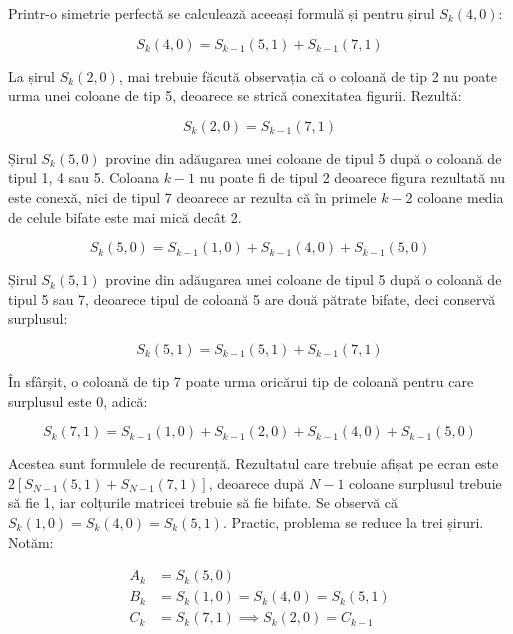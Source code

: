 Printr-o simetrie perfectă se calculează aceeași formulă și pentru șirul
$S_k(4,0)$:

\begin{equation}
  S_k(4,0)=S_{k-1}(5,1)+S_{k-1}(7,1)
\end{equation}

La șirul $S_k(2,0)$, mai trebuie făcută observația că o coloană de tip 2 nu
poate urma unei coloane de tip 5, deoarece se strică conexitatea
figurii. Rezultă:

\begin{equation}
  S_k(2,0)=S_{k-1}(7,1)
\end{equation}

Șirul $S_k(5,0)$ provine din adăugarea unei coloane de tipul 5 după o coloană
de tipul 1, 4 sau 5. Coloana $k-1$ nu poate fi de tipul 2 deoarece figura
rezultată nu este conexă, nici de tipul 7 deoarece ar rezulta că în primele
$k-2$ coloane media de celule bifate este mai mică decât 2.

\begin{equation}
  S_k(5,0)=S_{k-1}(1,0)+S_{k-1}(4,0)+S_{k-1}(5,0)
\end{equation}

Șirul $S_k(5,1)$ provine din adăugarea unei coloane de tipul 5 după o coloană
de tipul 5 sau 7, deoarece tipul de coloană 5 are două pătrate bifate, deci
conservă surplusul:

\begin{equation}
  S_k(5,1)=S_{k-1}(5,1)+S_{k-1}(7,1)
\end{equation}

În sfârșit, o coloană de tip 7 poate urma oricărui tip de coloană pentru care
surplusul este 0, adică:

\begin{equation}
  S_k(7,1)=S_{k-1}(1,0)+S_{k-1}(2,0)+S_{k-1}(4,0)+S_{k-1}(5,0)
\end{equation}

Acestea sunt formulele de recurență. Rezultatul care trebuie afișat pe ecran
este $2[S_{N-1}(5,1)+S_{N-1}(7,1)]$, deoarece după $N-1$ coloane surplusul
trebuie să fie 1, iar colțurile matricei trebuie să fie bifate. Se observă că
$S_k(1,0)=S_k(4,0)=S_k(5,1)$. Practic, problema se reduce la trei
șiruri. Notăm:

\begin{equation}
  \begin{split}
    A_k & = S_k(5,0) \\
    B_k & = S_k(1,0) = S_k(4,0) = S_k(5,1) \\
    C_k & = S_k(7,1) \implies S_k(2,0)=C_{k-1}
  \end{split}
\end{equation}

